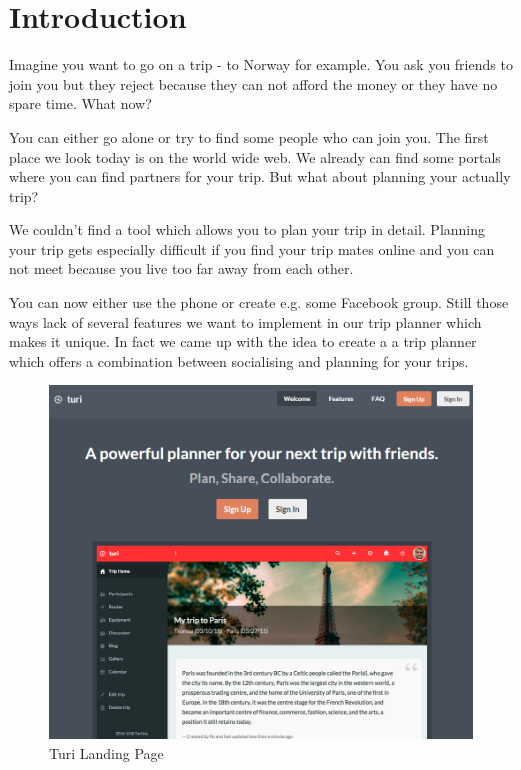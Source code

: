 \documentclass[a4paper]{article}
\begin{document}
\tableofcontents
\pagebreak


\section{Introduction}
Imagine you want to go on a trip - to Norway for example. You ask you friends to join you but they reject because they can not afford the money or they have no spare time. What now?

You can either go alone or try to find some people who can join you. The first place we look today is on the world wide web. We already can find some portals where you can find partners for your trip. But what about planning your actually trip?

We couldn’t find a tool which allows you to plan your trip in detail. Planning your trip gets especially difficult if you find your trip mates online and you can not meet because you live too far away from each other. 

You can now either use the phone or create e.g. some Facebook group. Still those ways lack of several features we want to implement in our trip planner which makes it unique. In fact we came up with the idea to create a a trip planner which offers a combination between socialising and planning for your trips.\\

\begin{figure}[!h]
  \begin{center}
    \includegraphics[width=1\textwidth]{pictures/turi_landing_page.png}
  \end{center}
\caption{Turi Landing Page}
\label{fig:turilandingpage}
\end{figure}
\end{document}
